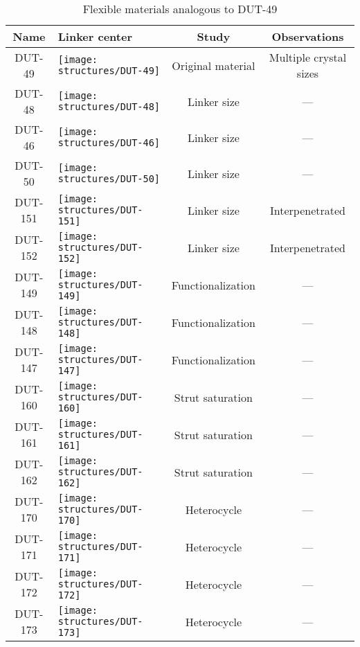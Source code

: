 \begin{table}[p]
	\centering
	\caption{Flexible materials analogous to DUT-49}
	\begin{tabular}{c>{\centering\arraybackslash} m{6cm}cc}
		\toprule
	    \textbf{Name}
        & \textbf{Linker center}
        & \textbf{Study}
        & \textbf{Observations} \\
		\midrule
        DUT-49  & 
            \texttt{[image: structures/DUT-49]}
            & Original material & Multiple crystal sizes \\
            \midrule    
        DUT-48  & 
            \texttt{[image: structures/DUT-48]}
            & Linker size & --- \\
        DUT-46  & 
            \texttt{[image: structures/DUT-46]}
            & Linker size & --- \\
        DUT-50  & 
            \texttt{[image: structures/DUT-50]}
            & Linker size & --- \\
        DUT-151  & 
            \texttt{[image: structures/DUT-151]} 
            & Linker size & Interpenetrated \\
        DUT-152  & 
            \texttt{[image: structures/DUT-152]}
            & Linker size & Interpenetrated \\
            \midrule
        DUT-149  & 
            \texttt{[image: structures/DUT-149]}
            & Functionalization & --- \\
        DUT-148  & 
            \texttt{[image: structures/DUT-148]}
            & Functionalization & --- \\
        DUT-147  & 
            \texttt{[image: structures/DUT-147]}
            & Functionalization & --- \\
            \midrule
        DUT-160  & 
            \texttt{[image: structures/DUT-160]}
            & Strut saturation & --- \\
        DUT-161  & 
            \texttt{[image: structures/DUT-161]}
            & Strut saturation & --- \\
        DUT-162  & 
            \texttt{[image: structures/DUT-162]}
            & Strut saturation & --- \\
            \midrule
        DUT-170  & 
            \texttt{[image: structures/DUT-170]}
            & Heterocycle & --- \\
        DUT-171  & 
            \texttt{[image: structures/DUT-171]}
            & Heterocycle & --- \\
        DUT-172  & 
            \texttt{[image: structures/DUT-172]}
            & Heterocycle & --- \\
        DUT-173  & 
            \texttt{[image: structures/DUT-173]}
            & Heterocycle & --- \\
        \bottomrule
	\end{tabular}%
	\label{dut:tab:materials}
\end{table}%
